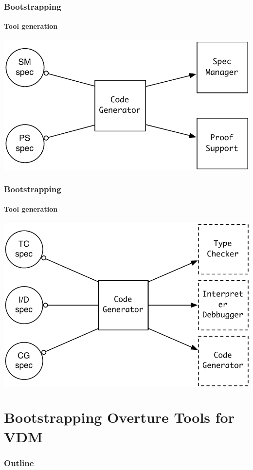 \documentclass[slidestop,uncompress,mathserif,final]{beamer}
\newcommand{\pgl}[0]{Peter Gorm Larsen}
\begin{document}
\begin{frame}[c]
  \frametitle{Bootstrapping}
  \framesubtitle{Tool generation}

  \begin{center}
    \includegraphics[width=.7\textwidth]{images/code_gen.pdf}
  \end{center}
\end{frame}

\begin{frame}[c]
  \frametitle{Bootstrapping}
  \framesubtitle{Tool generation}
 
  \begin{center}
    \includegraphics[width=.7\textwidth]{images/code_gen2.pdf}
  \end{center}
\end{frame}



\section[Overture]{Bootstrapping Overture Tools for VDM}
\label{sec:overture}

\begin{frame}[c]
  \frametitle{Outline}
  \tableofcontents[current]
\end{frame}
\end{document}
